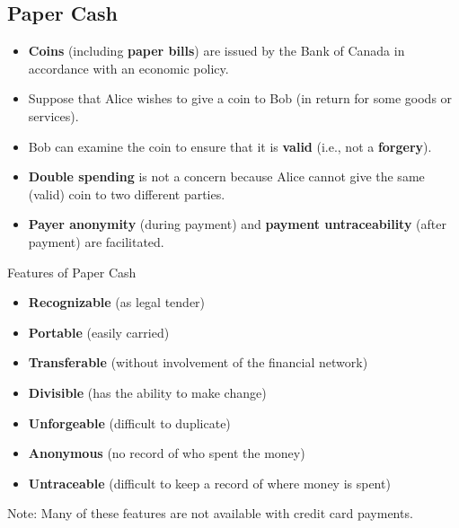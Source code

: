 \documentclass[12pt,titlepage]{article}
\begin{document}
\subsection{Paper Cash}
\begin{itemize}
	\item \textbf{Coins} (including \textbf{paper bills}) are issued by the Bank of Canada in accordance with an economic policy.
	\item Suppose that Alice wishes to give a coin to Bob (in return for some goods or services).
	\item Bob can examine the coin to ensure that it is \textbf{valid} (i.e., not a \textbf{forgery}).
	\item \textbf{Double spending} is not a concern because Alice cannot give the same (valid) coin to two different parties.
	\item \textbf{Payer anonymity} (during payment) and \textbf{payment untraceability} (after payment) are facilitated.
\end{itemize}
Features of Paper Cash\begin{itemize}
	\item \textbf{Recognizable} (as legal tender)
	\item \textbf{Portable} (easily carried)
	\item \textbf{Transferable} (without involvement of the financial network)
	\item \textbf{Divisible} (has the ability to make change)
	\item \textbf{Unforgeable} (difficult to duplicate)
	\item \textbf{Anonymous} (no record of who spent the money)
	\item \textbf{Untraceable} (difficult to keep a record of where money is spent)
\end{itemize}

Note: Many of these features are not available with credit card payments.
\end{document}
